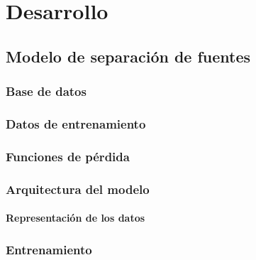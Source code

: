\documentclass[a4paper,11pt]{memoir}
\begin{document}
\chapter{Desarrollo}

\section{Modelo de separación de fuentes}

\subsection{Base de datos}

\subsection{Datos de entrenamiento}

\subsection{Funciones de pérdida}

\subsection{Arquitectura del modelo}

\subsubsection{Representación de los datos}





\subsection{Entrenamiento}




\end{document}
